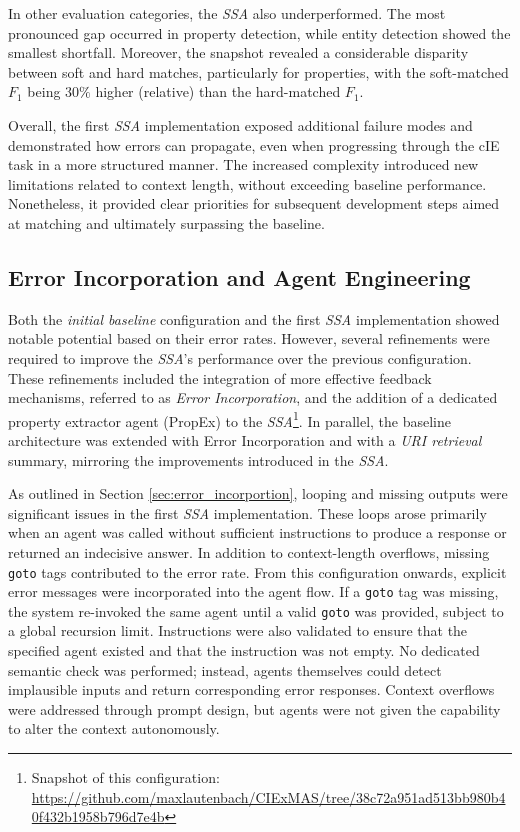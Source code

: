 \documentclass[a4paper,oneside,bibliography=totoc]{scrbook}
\begin{document}
In other evaluation categories, the \textit{\ac{SSA}} also underperformed. The most pronounced gap occurred in property detection, while entity detection showed the smallest shortfall. Moreover, the snapshot revealed a considerable disparity between soft and hard matches, particularly for properties, with the soft-matched $F_{1}$ being \(30\%\) higher (relative) than the hard-matched $F_{1}$.

Overall, the first \textit{\ac{SSA}} implementation exposed additional failure modes and demonstrated how errors can propagate, even when progressing through the \ac{cIE} task in a more structured manner. The increased complexity introduced new limitations related to context length, without exceeding baseline performance. Nonetheless, it provided clear priorities for subsequent development steps aimed at matching and ultimately surpassing the baseline.

\subsection{Error Incorporation and Agent Engineering}
\label{subsec:error_message_incorporation}

Both the \textit{initial baseline} configuration and the first \textit{\ac{SSA}} implementation showed notable potential based on their error rates. However, several refinements were required to improve the \textit{\ac{SSA}}’s performance over the previous configuration. These refinements included the integration of more effective feedback mechanisms, referred to as \textit{Error Incorporation}, and the addition of a dedicated property extractor agent (\ac{PropEx}) to the \textit{\ac{SSA}}\footnote{Snapshot of this configuration: \url{https://github.com/maxlautenbach/CIExMAS/tree/38c72a951ad513bb980b40f432b1958b796d7e4b}}. In parallel, the baseline architecture was extended with Error Incorporation and with a \textit{\ac{URI} retrieval} summary, mirroring the improvements introduced in the \textit{\ac{SSA}}.

As outlined in Section \ref{sec:error_incorportion}, looping and missing outputs were significant issues in the first \textit{\ac{SSA}} implementation. These loops arose primarily when an agent was called without sufficient instructions to produce a response or returned an indecisive answer. In addition to context-length overflows, missing \texttt{goto} tags contributed to the error rate. From this configuration onwards, explicit error messages were incorporated into the agent flow. If a \texttt{goto} tag was missing, the system re-invoked the same agent until a valid \texttt{goto} was provided, subject to a global recursion limit. Instructions were also validated to ensure that the specified agent existed and that the instruction was not empty. No dedicated semantic check was performed; instead, agents themselves could detect implausible inputs and return corresponding error responses. Context overflows were addressed through prompt design, but agents were not given the capability to alter the context autonomously.
\end{document}
